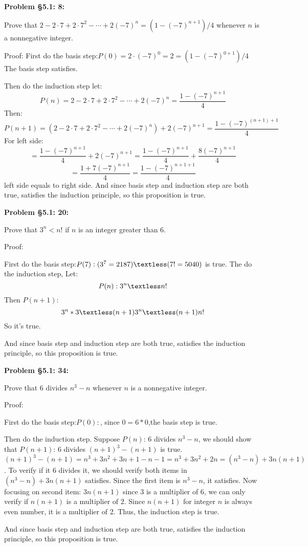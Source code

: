 \documentclass{article}
\newenvironment{problem}[1]
{\begin{mdframed}[default]
\textbf{Problem #1:}
}
{\end{mdframed}
}
\begin{document}
\begin{problem}{\S 5.1: 8}
Prove that $2 - 2 \cdot 7 + 2 \cdot 7^2 - \cdots + 2(-7)^n = (1-(-7)^{n+1})/4$
whenever $n$ is a nonnegative integer.

Proof:
First do the basis step:$P(0)=2\cdot (-7)^0=2=(1-(-7)^{0+1})/4$
The basis step satisfies.

Then do the induction step let:
\[P(n)=2 - 2 \cdot 7 + 2 \cdot 7^2 - \cdots + 2(-7)^n = \frac{1-(-7)^{n+1}}{4}\]
Then:
\[P(n+1)=(2 - 2 \cdot 7 + 2 \cdot 7^2 - \cdots + 2(-7)^{n}) +2(-7)^{n+1}= \frac{1-(-7)^{(n+1)+1}}{4}\]
For left side:
\[=\frac{1-(-7)^{n+1}}{4}+2(-7)^{n+1}=\frac{1-(-7)^{n+1}}{4}+\frac{8(-7)^{n+1}}{4}\]
\[=\frac{1+7(-7)^{n+1}}{4}=\frac{1-(-7)^{n+1+1}}{4}\]
left side equals to right side.
And since basis step and induction step are both true, satisfies the induction principle, so this proposition is true.

\end{problem}
\begin{problem}{\S 5.1: 20}
Prove that $3^n < n!$ if $n$ is an integer greater than $6$.

Proof:

First do the basis step:$P(7):(3^7=2187)\textless(7!=5040)$ is true.
The do the induction step, Let:
\[P(n): 3^n\textless n!\]
Then $P(n+1)$:
\[3^n*3\textless (n+1)3^n \textless(n+1)n!\]
So it's true.

And since basis step and induction step are both true, satisfies the induction principle, so this proposition is true.

\end{problem}
\begin{problem}{\S 5.1: 34}
Prove that $6$ divides $n^3 - n$ whenever $n$ is a nonnegative integer.

Proof:

First do the basis step:$P(0):$, since $0=6*0$,the basis step is true.

Then do the induction step. Suppose $P(n)$: 6 divides $n^3-n$, we should show that
$P(n+1)$: 6 divides $(n+1)^3-(n+1)$ is true.
$(n+1)^3-(n+1)=n^3+3n^2+3n+1-n-1=n^3+3n^2+2n=(n^3-n)+3n(n+1)$. 
To verify if it 6 divides it, we should verify both items in $(n^3-n)+3n(n+1)$ satisfies.
Since the first item is $n^3-n$, it satisfies. Now focusing on second item: $3n(n+1)$ since $3$ is a multiplier of $6$, we can only verify if $n(n+1)$ is a multiplier of $2$.
Since $n(n+1)$ for integer $n$ is always even number, it is a multiplier of 2.
Thus, the induction step is true.

And since basis step and induction step are both true, satisfies the induction principle, so this proposition is true.



\end{problem}
\end{document}
